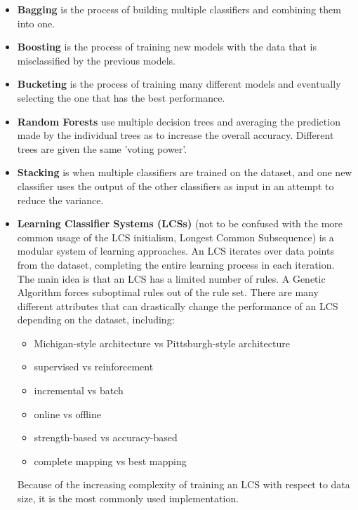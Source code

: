 \begin{itemize}
	\item \textbf{Bagging}
		is the process of building multiple classifiers and combining them into one.
	\item \textbf{Boosting}
		is the process of training new models with the data that is misclassified by the previous models.
	\item \textbf{Bucketing}
		is the process of training many different models and eventually selecting the one that has the best performance.
	\item \textbf{Random Forests}\cite{Breiman2001}
		use multiple decision trees and averaging the prediction made by the individual trees as to increase the overall accuracy. Different trees are given the same 'voting power'.
	\item \textbf{Stacking}
		is when multiple classifiers are trained on the dataset, and one new classifier uses the output of the other classifiers as input in an attempt to reduce the variance.
	\item \textbf{Learning Classifier Systems (LCSs)}
		(not to be confused with the more common usage of the LCS initialism, Longest Common Subsequence) is a modular system of learning approaches. An LCS iterates over data points from the dataset, completing the entire learning process in each iteration. The main idea is that an LCS has a limited number of rules. A Genetic Algorithm forces suboptimal rules out of the rule set. There are many different attributes that can drastically change the performance of an LCS depending on the dataset, including:
		\begin{itemize}
			\item Michigan-style architecture vs Pittsburgh-style architecture
			\item supervised vs reinforcement
			\item incremental vs batch
			\item online vs offline
			\item strength-based vs accuracy-based
			\item complete mapping vs best mapping
		\end{itemize}
		Because of the increasing complexity of training an LCS with respect to  data size, it is the most commonly used implementation.
\end{itemize}


%
%


